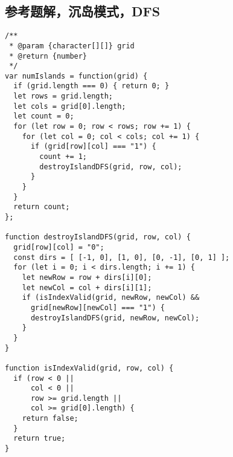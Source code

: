 \subsection{参考题解，沉岛模式，DFS}

\begin{verbatim}
/**
 * @param {character[][]} grid
 * @return {number}
 */
var numIslands = function(grid) {
  if (grid.length === 0) { return 0; }
  let rows = grid.length;
  let cols = grid[0].length;
  let count = 0;
  for (let row = 0; row < rows; row += 1) {
    for (let col = 0; col < cols; col += 1) {
      if (grid[row][col] === "1") {
        count += 1;
        destroyIslandDFS(grid, row, col);
      }
    }
  }
  return count;
};

function destroyIslandDFS(grid, row, col) {
  grid[row][col] = "0";
  const dirs = [ [-1, 0], [1, 0], [0, -1], [0, 1] ];
  for (let i = 0; i < dirs.length; i += 1) {
    let newRow = row + dirs[i][0];
    let newCol = col + dirs[i][1];
    if (isIndexValid(grid, newRow, newCol) &&
      grid[newRow][newCol] === "1") {
      destroyIslandDFS(grid, newRow, newCol);
    }
  }
}

function isIndexValid(grid, row, col) {
  if (row < 0 ||
      col < 0 ||
      row >= grid.length ||
      col >= grid[0].length) {
    return false;
  }
  return true;
}
\end{verbatim}
